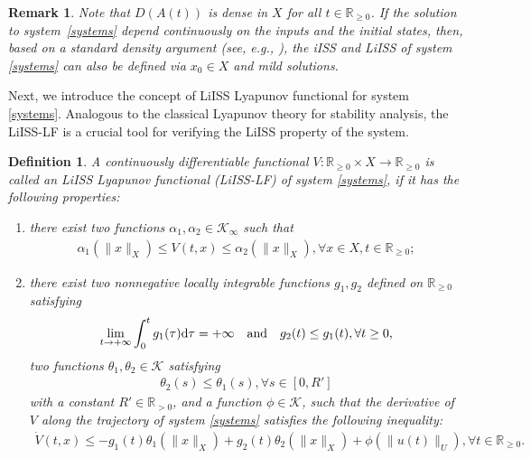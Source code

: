 \documentclass[onecolumn]{autart}
\newtheorem{definition}{Definition}
\newtheorem{remark}{Remark}
\newenvironment{proof of Prop.ODE}{{\it Proof of Proposition~\ref{Prop.ODE}:\enspace}}{\hfill $\blacksquare$\par}
\newenvironment{proof of PDE}{{\it Proof of Proposition \ref{Prop.8}:\enspace}}{\hfill $\blacksquare$\par}
\begin{document}
{\begin{remark} {Note that $D(A(t))$ is dense in $X$ for all $t\in \mathbb{R}_{\geq 0}$.
		If the solution {to} system~\eqref{systems}   depend continuously on the inputs and the initial states, then, based on  a standard density argument (see, e.g., \cite{mironchenko2023arxiv}),   the iISS and LiISS of system \eqref{systems} can  also be defined via  ${x}_0\in X$ and mild solutions. }%
	
\end{remark}

Next, we   introduce the concept of  {LiISS Lyapunov} functional  for system \eqref{systems}. Analogous to the classical Lyapunov theory for stability analysis, the LiISS-LF is a crucial tool for verifying the LiISS property of the system.
\begin{definition}\label{DLiISS}
	A {continuously differentiable} functional $V:\mathbb{R}_{\geq 0}\times  X \to \mathbb{R}_{\geq 0}$ is called an LiISS Lyapunov functional {(LiISS-LF)} of system \eqref{systems}, if it has the following properties:
	\begin{enumerate}
		\item[(i)]  there {exist} two functions $ \alpha_{1},\alpha_{2} \in \mathcal{K}_{\infty}$  such that
		\begin{align}\label{V}
			{\alpha_{1}}(\|x\|_{ X })\leq {V(t, x )}\leq{\alpha_{2}}(\|x\|_{ X }),  \forall x\in X ,  t\in\mathbb{R}_{\geq0};
		\end{align}
		\item[(ii)]  there {exist two nonnegative} locally integrable functions $g_1, g_2$ defined on $\mathbb{R}_{\geq 0}$ satisfying \begin{align*}
			\lim\limits_{t\rightarrow +\infty}\int_0^tg_1(\tau){\rm{d}}\tau=+\infty\quad \text{and}\quad g_2(t)\leq g_1(t),\forall t\geq0,
		\end{align*}
		two functions $\theta_{1},\theta_{2} \in\mathcal{K}$  satisfying
		\begin{align}
			\theta_{2}(s)\leq\theta_{1}(s),  \forall s\in[0, R'] \label{4}
		\end{align}
		with {a constant $R'\in \mathbb{R}_{>0}$,}
		and a function $\phi\in\mathcal{K}$,   such that  the  derivative of $V$ along the trajectory of   system \eqref{systems}  satisfies the following inequality:
		\begin{align}\label{DV}
			{\dot{V}(t, x)} \leq -g_{1}(t)\theta_{1}(\|x\|_{ X })+g_{2}(t)\theta_{2}(\|x\|_{ X })+\phi(\|u(t)\|_{ U}) ,  \forall   t \in\mathbb{R}_{\geq0}.
		\end{align}
	\end{enumerate}
	

\end{definition}}
\end{document}
